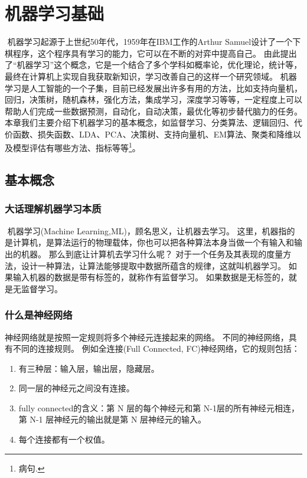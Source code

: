 \chapter{机器学习基础}
\label{ux7b2cux4e8cux7ae0-ux673aux5668ux5b66ux4e60ux57faux7840}
​ 机器学习起源于上世纪50年代，1959年在IBM工作的Arthur Samuel设计了一个下棋程序，这个程序具有学习的能力，它可以在不断的对弈中提高自己。
由此提出了``机器学习''这个概念，它是一个结合了多个学科如概率论，优化理论，统计等，最终在计算机上实现自我获取新知识，学习改善自己的这样一个研究领域。
机器学习是人工智能的一个子集，目前已经发展出许多有用的方法，比如支持向量机，回归，决策树，随机森林，强化方法，集成学习，深度学习等等，一定程度上可以帮助人们完成一些数据预测，自动化，自动决策，最优化等初步替代脑力的任务。
本章我们主要介绍下机器学习的基本概念，如监督学习、分类算法、逻辑回归、代价函数、损失函数、LDA、PCA、决策树、支持向量机、EM算法、聚类和降维以及模型评估有哪些方法、指标等等\footnote{病句.}。

\section{基本概念}
\label{ux57faux672cux6982ux5ff5}
\subsection{大话理解机器学习本质}
\label{ux5927ux8bddux7406ux89e3ux673aux5668ux5b66ux4e60ux672cux8d28}
​ 机器学习(Machine Learning,ML)，顾名思义，让机器去学习。
这里，机器指的是计算机，是算法运行的物理载体，你也可以把各种算法本身当做一个有输入和输出的机器。
那么到底让计算机去学习什么呢？
对于一个任务及其表现的度量方法，设计一种算法，让算法能够提取中数据所蕴含的规律，这就叫机器学习。
如果输入机器的数据是带有标签的，就称作有监督学习。
如果数据是无标签的，就是无监督学习。

\subsection{什么是神经网络}
\label{ux4ec0ux4e48ux662fux795eux7ecfux7f51ux7edc}
神经网络就是按照一定规则将多个神经元连接起来的网络。
不同的神经网络，具有不同的连接规则。
例如全连接(Full Connected, FC)神经网络，它的规则包括：
\begin{enumerate}
\item 有三种层：输入层，输出层，隐藏层。
\item 同一层的神经元之间没有连接。
\item fully connected的含义：第 N 层的每个神经元和第 N-1层的所有神经元相连，第 N-1 层神经元的输出就是第 N 层神经元的输入。
\item 每个连接都有一个权值。
\end{enumerate}
